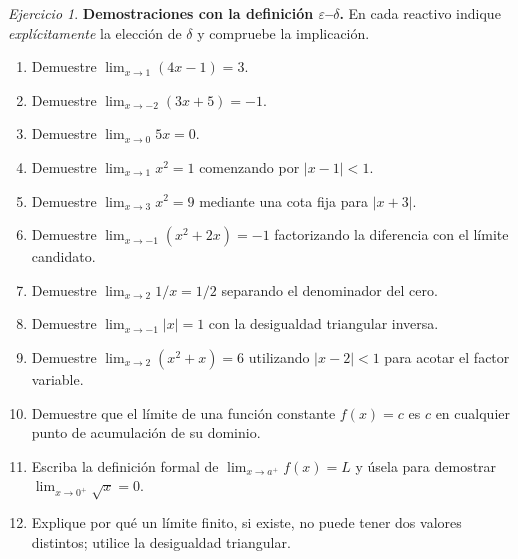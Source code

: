 \documentclass[12pt]{article}
\theoremstyle{remark}
\newtheorem{Ejer}{Ejercicio}
\begin{document}
\begin{Ejer}\textbf{Demostraciones con la definición $\varepsilon$--$\delta$.} En cada reactivo indique \emph{explícitamente} la elección de $\delta$ y compruebe la implicación.
\begin{enumerate}[resume=banco]
\item Demuestre $\lim_{x\to1}(4x-1)=3$.
\item Demuestre $\lim_{x\to-2}(3x+5)=-1$.
\item Demuestre $\lim_{x\to0}5x=0$.
\item Demuestre $\lim_{x\to1}x^2=1$ comenzando por $|x-1|<1$.
\item Demuestre $\lim_{x\to3}x^2=9$ mediante una cota fija para $|x+3|$.
\item Demuestre $\lim_{x\to-1}(x^2+2x)=-1$ factorizando la diferencia con el límite candidato.
\item Demuestre $\lim_{x\to2}1/x=1/2$ separando el denominador del cero.
\item Demuestre $\lim_{x\to-1}|x|=1$ con la desigualdad triangular inversa.
\item Demuestre $\lim_{x\to2}(x^2+x)=6$ utilizando $|x-2|<1$ para acotar el factor variable.
\item Demuestre que el límite de una función constante $f(x)=c$ es $c$ en cualquier punto de acumulación de su dominio.
\item Escriba la definición formal de $\lim_{x\to a^+}f(x)=L$ y úsela para demostrar $\lim_{x\to0^+}\sqrt{x}=0$.
\item Explique por qué un límite finito, si existe, no puede tener dos valores distintos; utilice la desigualdad triangular.
\end{enumerate}
\end{Ejer}
\end{document}
